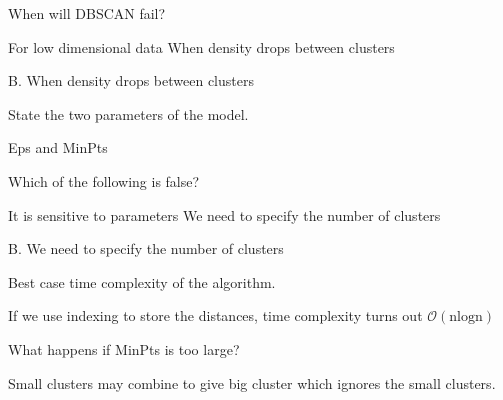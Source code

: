 \documentclass[12pt,letterpaper, onecolumn]{exam}
\begin{document}
\begin{questions}
\question[] 
When will DBSCAN fail?
\begin{choices}
\choice For low dimensional data
\choice When density drops between clusters
\end{choices}
\begin{Solution}
B. When density drops between clusters
\end{Solution}


\question[] State the two parameters of the model.\\
\begin{Solution}
Eps and MinPts
\end{Solution}


\question[] Which of the following is false?
\begin{choices}
\choice It is sensitive to parameters
\choice We need to specify the number of clusters
\end{choices}
\begin{Solution}
B. We need to specify the number of clusters
\end{Solution}



\question[] Best case time complexity of the algorithm.\\
\begin{Solution}
If we use indexing to store the distances, time complexity turns out 
$\mathcal{O}(\text{nlogn})$
\end{Solution}



\question[] What happens if MinPts is too large?\\
\begin{Solution}
Small clusters may combine to give big cluster which ignores the small clusters.
\end{Solution}

\end{questions}
\end{document}
